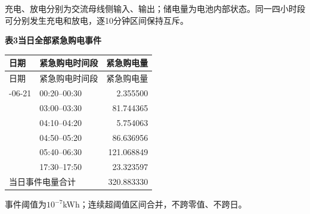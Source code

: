 \noindent 充电、放电分别为交流母线侧输入、输出；储电量为电池内部状态。同一四小时段可分别发生充电和放电，逐10分钟区间保持互斥。
\begin{center}\textbf{表3\quad 当日全部紧急购电事件}\end{center}
\begin{longtable}{llr}\toprule 日期 & 紧急购电时间段 & 紧急购电量\\\midrule\endfirsthead
\toprule 日期 & 紧急购电时间段 & 紧急购电量\\\midrule\endhead
\bottomrule\endfoot
2025-06-21 & 00:20--00:30 & 2.355500\\
 & 03:00--03:30 & 81.744365\\
 & 04:10--04:20 & 5.754063\\
 & 04:50--05:20 & 86.636956\\
 & 05:40--06:30 & 121.068849\\
 & 17:30--17:50 & 23.323597\\
\midrule\multicolumn{2}{l}{当日事件电量合计} & 320.883330\\
\end{longtable}
\noindent 事件阈值为$10^{-7}$kWh；连续超阈值区间合并，不跨零值、不跨日。
\endgroup
\clearpage
